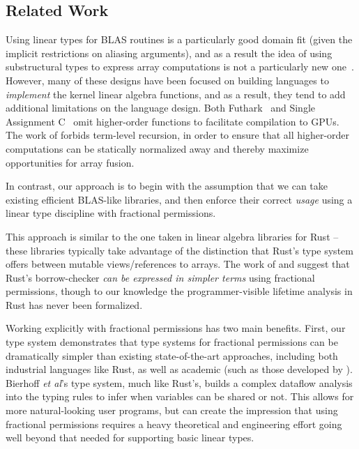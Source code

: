 \subsection{Related Work}

Using linear types for BLAS routines is a particularly good domain fit (given
the implicit restrictions on aliasing arguments), and as a result the idea of
using substructural types to express array computations is not a particularly
new one~\cite{scholz,henriksen,bernardy2016}.  However, many of these designs
have been focused on building languages to \emph{implement} the kernel linear
algebra functions, and as a result, they tend to add additional limitations on
the language design. Both Futhark~\cite{henriksen} and Single Assignment
C~\cite{scholz} omit higher-order functions to facilitate compilation to GPUs.
The work of \cite{bernardy2016} forbids term-level recursion, in order to
ensure that all higher-order computations can be statically normalized away and
thereby maximize opportunities for array fusion.

In contrast, our approach is to begin with the assumption that we can take
existing efficient BLAS-like libraries, and then enforce their correct
\emph{usage} using a linear type discipline with fractional permissions. 

This approach is similar to the one taken in linear algebra libraries for Rust
-- these libraries typically take advantage of the distinction that Rust's type
system offers between mutable views/references to arrays.  The work of
\cite{weiss} and \cite{rustbelt} suggest that Rust's borrow-checker \emph{can
be expressed in simpler terms} using fractional permissions, though to our
knowledge the programmer-visible lifetime analysis in Rust has never been
formalized.

Working explicitly with fractional permissions has two main benefits. First,
our type system demonstrates that type systems for fractional permissions can
be dramatically simpler than existing state-of-the-art approaches, including
both industrial languages like Rust, as well as academic (such as those
developed by \cite{bierhoff}).  Bierhoff \emph{et al}'s type system, much like
Rust's, builds a complex dataflow analysis into the typing rules to infer when
variables can be shared or not. This allows for more natural-looking user
programs, but can create the impression that using fractional permissions
requires a heavy theoretical and engineering effort going well beyond that
needed for supporting basic linear types.

